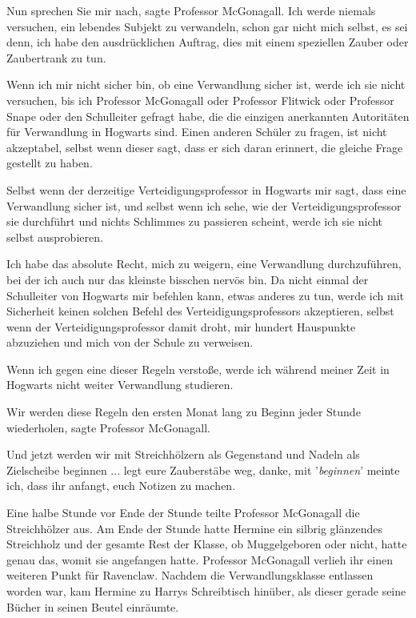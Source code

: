 \glqq Nun sprechen Sie mir nach\grqq{}, sagte Professor McGonagall. \glqq Ich
werde niemals versuchen, ein lebendes Subjekt zu verwandeln, schon gar nicht
mich selbst, es sei denn, ich habe den ausdrücklichen Auftrag, dies mit einem
speziellen Zauber oder Zaubertrank zu tun.\grqq{}

\glqq Wenn ich mir nicht sicher bin, ob eine Verwandlung sicher ist, werde ich
sie nicht versuchen, bis ich Professor McGonagall oder Professor Flitwick oder
Professor Snape oder den Schulleiter gefragt habe, die die einzigen anerkannten
Autoritäten für Verwandlung in Hogwarts sind. Einen anderen Schüler zu fragen,
ist nicht akzeptabel, selbst wenn dieser sagt, dass er sich daran erinnert, die
gleiche Frage gestellt zu haben.\grqq{}

\glqq Selbst wenn der derzeitige Verteidigungsprofessor in Hogwarts mir sagt,
dass eine Verwandlung sicher ist, und selbst wenn ich sehe, wie der
Verteidigungsprofessor sie durchführt und nichts Schlimmes zu passieren scheint,
werde ich sie nicht selbst ausprobieren.\grqq{}

\glqq Ich habe das absolute Recht, mich zu weigern, eine Verwandlung
durchzuführen, bei der ich auch nur das kleinste bisschen nervös bin. Da nicht
einmal der Schulleiter von Hogwarts mir befehlen kann, etwas anderes zu tun,
werde ich mit Sicherheit keinen solchen Befehl des Verteidigungsprofessors
akzeptieren, selbst wenn der Verteidigungsprofessor damit droht, mir hundert
Hauspunkte abzuziehen und mich von der Schule zu verweisen.\grqq{}

\glqq Wenn ich gegen eine dieser Regeln verstoße, werde ich während meiner Zeit
in Hogwarts nicht weiter Verwandlung studieren.\grqq{}

\glqq Wir werden diese Regeln den ersten Monat lang zu Beginn jeder Stunde
wiederholen\grqq{}, sagte Professor McGonagall.

\glqq Und jetzt werden wir mit Streichhölzern als Gegenstand und Nadeln als
Zielscheibe beginnen ... legt eure Zauberstäbe weg, danke, mit '\emph{beginnen}'
meinte ich, dass ihr anfangt, euch Notizen zu machen.\grqq{}

Eine halbe Stunde vor Ende der Stunde teilte Professor McGonagall die
Streichhölzer aus. Am Ende der Stunde hatte Hermine ein silbrig glänzendes
Streichholz und der gesamte Rest der Klasse, ob Muggelgeboren oder nicht, hatte
genau das, womit sie angefangen hatte. Professor McGonagall verlieh ihr einen
weiteren Punkt für Ravenclaw. Nachdem die Verwandlungsklasse entlassen worden
war, kam Hermine zu Harrys Schreibtisch hinüber, als dieser gerade seine Bücher
in seinen Beutel einräumte.

